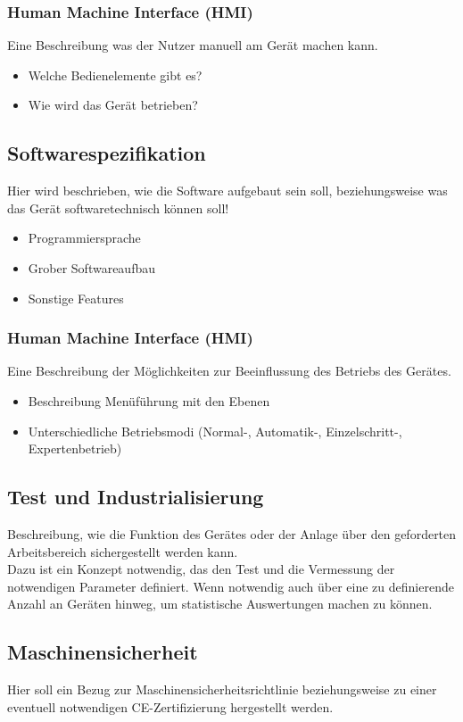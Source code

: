 \documentclass[12pt]{article}
\begin{document}
\subsubsection{Human Machine Interface (HMI)}
Eine Beschreibung was der Nutzer manuell am Gerät machen kann.
\begin{itemize}
    \item Welche Bedienelemente gibt es?
    \item Wie wird das Gerät betrieben?
\end{itemize}

\subsection{Softwarespezifikation}
Hier wird beschrieben, wie die Software aufgebaut sein soll, beziehungsweise was das Gerät softwaretechnisch können soll!
\begin{itemize}
    \item Programmiersprache
    \item Grober Softwareaufbau
    \item Sonstige Features
\end{itemize}

\subsubsection{Human Machine Interface (HMI)}
Eine Beschreibung der Möglichkeiten zur Beeinflussung des Betriebs des Gerätes.
\begin{itemize}
    \item Beschreibung Menüführung mit den Ebenen
    \item Unterschiedliche Betriebsmodi (Normal-, Automatik-, Einzelschritt-, Expertenbetrieb)
\end{itemize}

\subsection{Test und Industrialisierung}
Beschreibung, wie die Funktion des Gerätes oder der Anlage über den geforderten Arbeitsbereich sichergestellt werden kann. \\
Dazu ist ein Konzept notwendig, das den Test und die Vermessung der notwendigen Parameter definiert.
Wenn notwendig auch über eine zu definierende Anzahl an Geräten hinweg, um statistische Auswertungen machen zu können.

\subsection{Maschinensicherheit}
Hier soll ein Bezug zur Maschinensicherheitsrichtlinie beziehungsweise zu einer eventuell notwendigen CE-Zertifizierung hergestellt werden.
\end{document}
